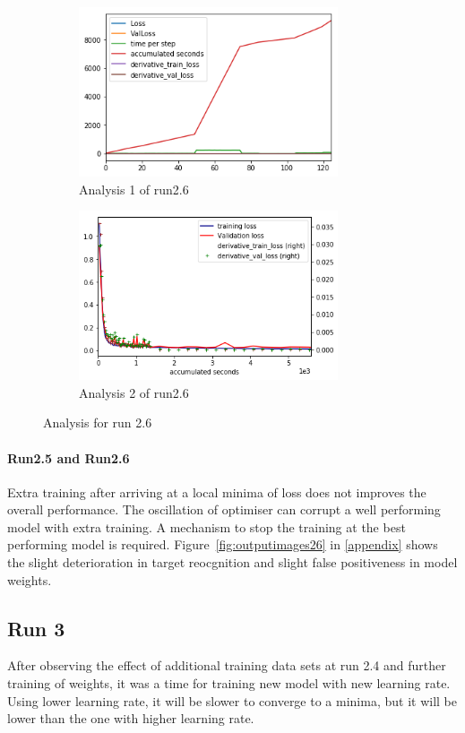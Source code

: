 \documentclass[paper=a4, fontsize=11pt]{scrartcl} %
\numberwithin{equation}{section} %
\numberwithin{figure}{section} %
\numberwithin{table}{section} %
\begin{document}
\begin{figure}	
	\begin{subfigure}{0.45\textwidth}
	\includegraphics[width=0.9\linewidth, height=5cm]{./imgs/analysis_0_2_6.png} 
	\caption{Analysis 1 of run2.6}
	\label{fig:subAnalysisRun26}
	\end{subfigure}
	\begin{subfigure}{0.45\textwidth}
	\includegraphics[width=0.9\linewidth, height=5cm]{./imgs/analysis_0_2_6plot.png}
	\caption{Analysis 2 of run2.6}
	\label{fig:subAnalysisRun26plot}
	\end{subfigure}
	 
	\caption{Analysis for run 2.6}
	\label{fig:AnalysisRun26}
 \end{figure}
 \paragraph{Run2.5 and Run2.6}
 Extra training after arriving at a local minima of loss does not improves the overall performance. The oscillation of optimiser can corrupt a well performing model with extra training. A mechanism to stop the training at the best performing model is required. Figure~\ref{fig:outputimages26} in \ref{appendix} shows the slight deterioration in target reocgnition and slight false positiveness in model weights.
\subsection{Run 3}
After observing the effect of additional training data sets at run 2.4 and further training of weights, it was a time for training new model with new learning rate.
Using lower learning rate, it will be slower to converge to a minima, but it will be lower than the one with higher learning rate.
\end{document}
